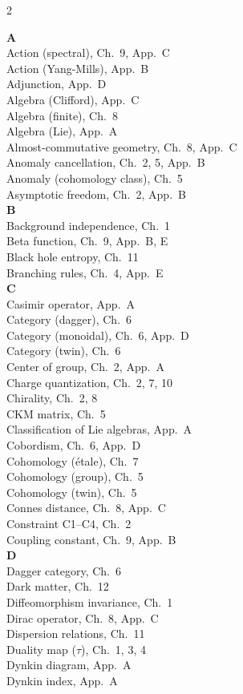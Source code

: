 \documentclass[11pt,a4paper,openright]{book}
\theoremstyle{plain}
\theoremstyle{definition}
\begin{document}
\begin{multicols}{2}
\small

\textbf{A}\\[2pt]
Action (spectral), Ch.~9, App.~C\\
Action (Yang-Mills), App.~B\\
Adjunction, App.~D\\
Algebra (Clifford), App.~C\\
Algebra (finite), Ch.~8\\
Algebra (Lie), App.~A\\
Almost-commutative geometry, Ch.~8, App.~C\\
Anomaly cancellation, Ch.~2, 5, App.~B\\
Anomaly (cohomology class), Ch.~5\\
Asymptotic freedom, Ch.~2, App.~B\\[4pt]

\textbf{B}\\[2pt]
Background independence, Ch.~1\\
Beta function, Ch.~9, App.~B, E\\
Black hole entropy, Ch.~11\\
Branching rules, Ch.~4, App.~E\\[4pt]

\textbf{C}\\[2pt]
Casimir operator, App.~A\\
Category (dagger), Ch.~6\\
Category (monoidal), Ch.~6, App.~D\\
Category (twin), Ch.~6\\
Center of group, Ch.~2, App.~A\\
Charge quantization, Ch.~2, 7, 10\\
Chirality, Ch.~2, 8\\
CKM matrix, Ch.~5\\
Classification of Lie algebras, App.~A\\
Cobordism, Ch.~6, App.~D\\
Cohomology (étale), Ch.~7\\
Cohomology (group), Ch.~5\\
Cohomology (twin), Ch.~5\\
Connes distance, Ch.~8, App.~C\\
Constraint C1--C4, Ch.~2\\
Coupling constant, Ch.~9, App.~B\\[4pt]

\textbf{D}\\[2pt]
Dagger category, Ch.~6\\
Dark matter, Ch.~12\\
Diffeomorphism invariance, Ch.~1\\
Dirac operator, Ch.~8, App.~C\\
Dispersion relations, Ch.~11\\
Duality map ($\tau$), Ch.~1, 3, 4\\
Dynkin diagram, App.~A\\
Dynkin index, App.~A\\[4pt]


\end{multicols}
\end{document}
